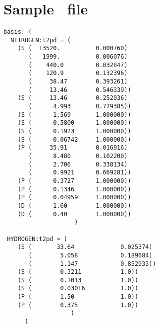 \section{Sample \basisdat\ file}
\begin{verbatim}
basis: (
  NITROGEN:t2pd = (
    (S (  13520.          0.000760)
       (   1999.          0.006076)
       (    440.0         0.032847)
       (    120.9         0.132396)
       (     38.47        0.393261)
       (     13.46        0.546339))
    (S (     13.46        0.252036)
       (      4.993       0.779385))
    (S (      1.569       1.000000))
    (S (      0.5800      1.000000))
    (S (      0.1923      1.000000))
    (S (      0.06742     1.000000))
    (P (     35.91        0.016916)
       (      8.480       0.102200)
       (      2.706       0.338134)
       (      0.9921      0.669281))
    (P (      0.3727      1.000000))
    (P (      0.1346      1.000000))
    (P (      0.04959     1.000000))
    (D (      1.60        1.000000))
    (D (      0.40        1.000000))
                    )

 HYDROGEN:t2pd = (
    (S (       33.64             0.025374)
       (        5.058            0.189684)
       (        1.147            0.852933))
    (S (        0.3211           1.0))
    (S (        0.1013           1.0))
    (S (        0.03016          1.0))
    (P (        1.50             1.0))
    (P (        0.375            1.0))
                   )
      )
\end{verbatim}
